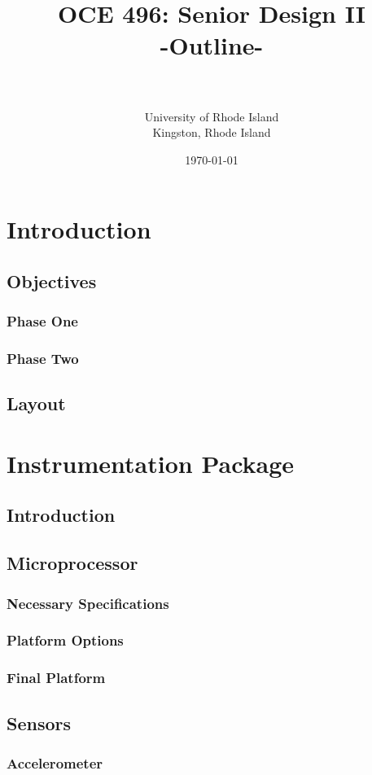 \documentclass[twoside,11pt]{report}
\title{
	\fontsize{20pt}{10pt}\selectfont
	\textbf{OCE 496: Senior Design II\\ \fontsize{16}{10}\selectfont\textbf{-Outline-}}
	}
\author{%
	\large
	\textsc{}\\
	\normalsize{}\\
	\normalsize	University of Rhode Island\\
	\normalsize Kingston, Rhode Island\\
	}
\date{\normalsize\vspace{-3mm}\today}
\begin{document}
\maketitle
\tableofcontents

\chapter{Introduction}
	\section{Objectives}
		\subsection{Phase One}
		\subsection{Phase Two}
	\section{Layout}
	
\chapter{Instrumentation Package}
	\section{Introduction}
	\section{Microprocessor}
		\subsection{Necessary Specifications}
		\subsection{Platform Options}
		\subsection{Final Platform}
	\section{Sensors}
		\subsection{Accelerometer}
\end{document}
